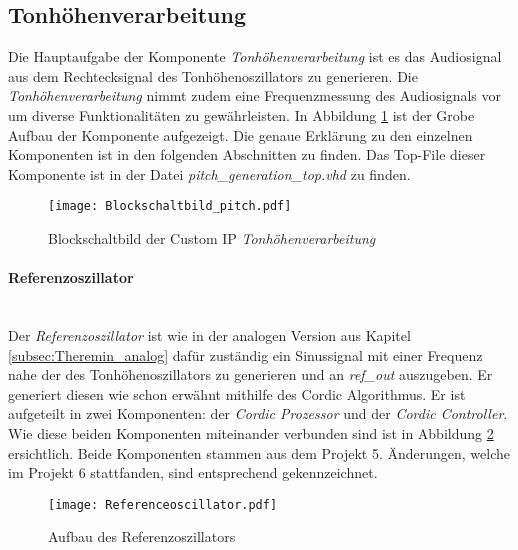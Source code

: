 \subsection{Tonhöhenverarbeitung}\label{subsec:Pitch_Generation}

Die Hauptaufgabe der Komponente \textit{Tonhöhenverarbeitung} ist es das Audiosignal aus dem Rechtecksignal des Tonhöhenoszillators zu generieren. Die \textit{Tonhöhenverarbeitung} nimmt zudem eine Frequenzmessung des Audiosignals vor um diverse Funktionalitäten zu gewährleisten. In Abbildung \ref{img:Blockschaltbild_pitch} ist der Grobe Aufbau der Komponente aufgezeigt. Die genaue Erklärung zu den einzelnen Komponenten ist in den folgenden Abschnitten zu finden. Das Top-File dieser Komponente ist in der Datei \textit{pitch\_generation\_top.vhd} zu finden.


\begin{figure}[h!]
	\centering
	\texttt{[image: Blockschaltbild\_pitch.pdf]}
	\caption{Blockschaltbild der Custom IP \textit{Tonhöhenverarbeitung}} 
	\label{img:Blockschaltbild_pitch}
\end{figure}  



\paragraph{Referenzoszillator}\mbox{}\\

Der \textit{Referenzoszillator} ist wie in der analogen Version aus Kapitel \ref{subsec:Theremin_analog} dafür zuständig ein Sinussignal mit einer Frequenz nahe der des Tonhöhenoszillators zu generieren und an \textit{ref\_out} auszugeben. Er generiert diesen wie schon erwähnt mithilfe des Cordic Algorithmus. Er ist aufgeteilt in zwei Komponenten: der \textit{Cordic Prozessor} und der \textit{Cordic Controller}. Wie diese beiden Komponenten miteinander verbunden sind ist in Abbildung \ref{img:Referenceoscillator} ersichtlich. Beide Komponenten stammen aus dem Projekt 5. Änderungen, welche im Projekt 6 stattfanden, sind entsprechend gekennzeichnet. \\

\begin{figure}[t]
	\centering
	\texttt{[image: Referenceoscillator.pdf]}
	\caption{Aufbau des Referenzoszillators} 
	\label{img:Referenceoscillator}
\end{figure}  

